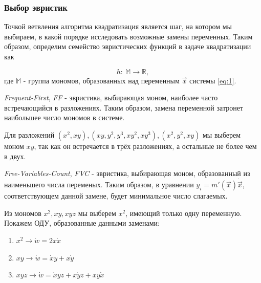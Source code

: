 \subsubsection{Выбор эвристик} \label{heuristics}

Точкой ветвления алгоритма квадратизация является шаг, на котором мы выбираем, в какой порядке исследовать возможные замены переменных. Таким образом, определим семейство эвристических функций в задаче квадратизации как 

\begin{equation}
    h:\ \mathbb{M} \longrightarrow \mathbb{R},
\end{equation}
где $\mathbb{M}$ - группа мономов, образованных над переменным $\vec x$ системы \ref{eq:1}. 

\begin{heuristics} \label{FF}
    \textit{Frequent-First}, \textit{FF} - эвристика, выбирающая моном, наиболее часто встречающийся в разложениях. Таким образом, замена переменной затронет наибольшее число мономов в системе.
    
    \begin{example}
        Для разложений $(x^2, xy), (xy, y^2, y^3, xy^2, xy^3), (x^2, y^2, xy)$ мы выберем моном $xy$, так как он встречается в трёх разложениях, а остальные не более чем в двух.
    \end{example}
\end{heuristics}

\begin{heuristics} \label{FVC}
    \textit{Free-Variables-Count}, \textit{FVC} - эвристика, выбирающая моном, образованный из наименьшего числа    переменых. Таким образом, в уравнении $y_i = m'(\vec x) \dot{\vec x}$, соответствующем данной замене, будет минимальное число слагаемых.
    
    \begin{example}
        Из мономов $x^2, xy, xyz$ мы выберем $x^2$, имеющий только одну переменную. Покажем ОДУ, образованные данными заменами:
        \begin{enumerate}
            \item $x^2 \longrightarrow \dot w = 2x \dot x$
            \item $xy \longrightarrow \dot w = \dot x y + x \dot y$
            \item $xyz \longrightarrow \dot w = \dot x yz + x \dot y z + xy \dot x$
        \end{enumerate}
    \end{example}
\end{heuristics}

